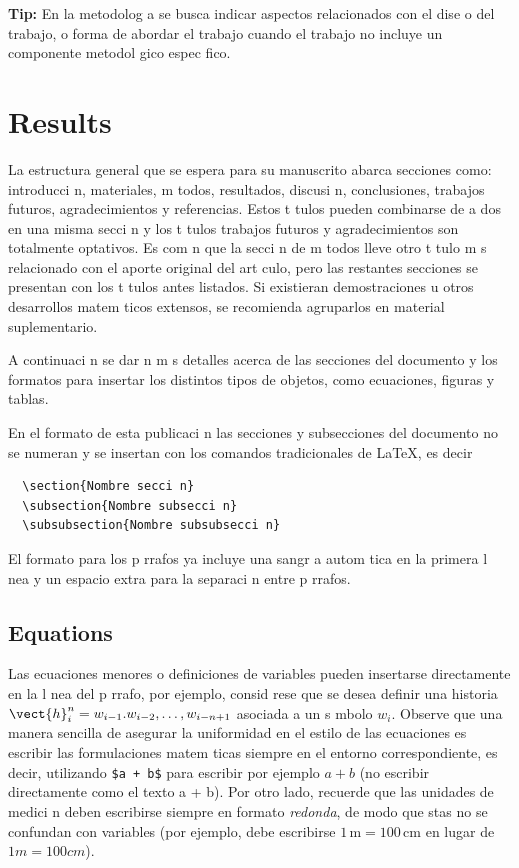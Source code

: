 \documentclass{article}
\begin{document}
\textbf{Tip:} En la metodolog a se busca indicar aspectos relacionados con el dise o del trabajo, o forma de abordar el trabajo cuando el trabajo no incluye un componente metodol gico espec fico. 


\section{Results}

La estructura general que se espera para su manuscrito abarca secciones como: introducci n,
materiales, m todos, resultados, discusi n, conclusiones, trabajos futuros, agradecimientos y 
referencias. Estos t tulos pueden combinarse de a dos en una misma secci n y los t tulos trabajos 
futuros y agradecimientos son totalmente optativos. Es com n que la secci n de m todos lleve otro 
t tulo m s relacionado con el aporte original del art culo, pero las restantes secciones se presentan
con los t tulos antes listados. Si existieran demostraciones u otros desarrollos matem ticos extensos,
se recomienda agruparlos en material suplementario.

A continuaci n se dar n m s detalles acerca de las secciones del documento y los formatos para 
insertar los distintos tipos de objetos, como ecuaciones, figuras y tablas.

En el formato de esta publicaci n las secciones y subsecciones del documento no se numeran y 
se insertan con los comandos tradicionales de \LaTeX, es decir
\begin{verbatim}
  \section{Nombre secci n}
  \subsection{Nombre subsecci n}
  \subsubsection{Nombre subsubsecci n}
\end{verbatim}
El formato para los p rrafos ya incluye una sangr a autom tica en la primera l nea y un espacio extra para la separaci n entre p rrafos.

\subsection{Equations}
Las ecuaciones menores o definiciones de variables pueden insertarse directamente en la l nea del
p rrafo, por ejemplo, consid rese que se desea definir una historia $\vect{h}_i^n = w_{i-1}. w_{i-2},
\dots, w_{i-n+1}$ asociada a un s mbolo $w_i$. Observe que una manera sencilla de asegurar la 
uniformidad en el estilo de las ecuaciones es escribir las formulaciones matem ticas siempre en el
entorno correspondiente, es decir, utilizando \verb!$a + b$! para escribir por ejemplo $a + b$
(no escribir directamente como el texto a + b). Por otro lado, recuerde que las unidades de medici n
deben escribirse siempre en formato \emph{redonda}, de modo que  stas no se confundan con variables
(por ejemplo, debe escribirse $1\,\text{m} = 100\,\text{cm}$ en lugar de $1m = 100cm$).
\end{document}
